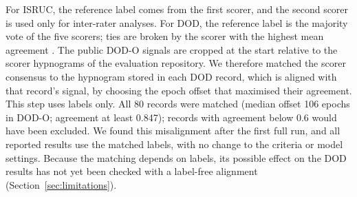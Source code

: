 For ISRUC, the reference label comes from the first scorer, and the second scorer is used only for inter-rater analyses. For DOD, the reference label is the majority vote of the five scorers; ties are broken by the scorer with the highest mean agreement \cite{guillot2020dod}. The public DOD-O signals are cropped at the start relative to the scorer hypnograms of the evaluation repository. We therefore matched the scorer consensus to the hypnogram stored in each DOD record, which is aligned with that record's signal, by choosing the epoch offset that maximised their agreement. This step uses labels only. All 80 records were matched (median offset 106 epochs in DOD-O; agreement at least 0.847); records with agreement below 0.6 would have been excluded. We found this misalignment after the first full run, and all reported results use the matched labels, with no change to the criteria or model settings. Because the matching depends on labels, its possible effect on the DOD results has not yet been checked with a label-free alignment (Section~\ref{sec:limitations}). %

